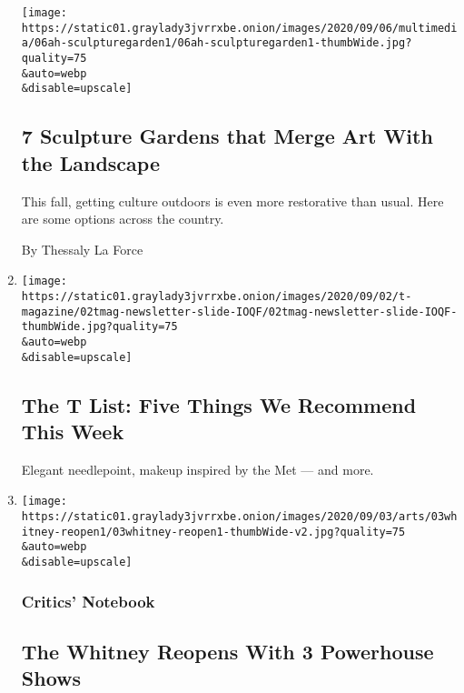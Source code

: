 \begin{enumerate}
  \texttt{[image: https://static01.graylady3jvrrxbe.onion/images/2020/09/06/multimedia/06ah-sculpturegarden1/06ah-sculpturegarden1-thumbWide.jpg?quality=75\\\&auto=webp\\\&disable=upscale]}

  \hypertarget{7-sculpture-gardens-that-merge-art-with-the-landscape}{%
  \subsection{7 Sculpture Gardens that Merge Art With the
  Landscape}\label{7-sculpture-gardens-that-merge-art-with-the-landscape}}

  This fall, getting culture outdoors is even more restorative than
  usual. Here are some options across the country.

  By Thessaly La Force
\item
  \href{/2020/09/03/t-magazine/ollies-pizza-estee-lauder-met.html}{}

  \texttt{[image: https://static01.graylady3jvrrxbe.onion/images/2020/09/02/t-magazine/02tmag-newsletter-slide-IOQF/02tmag-newsletter-slide-IOQF-thumbWide.jpg?quality=75\\\&auto=webp\\\&disable=upscale]}

  \hypertarget{the-t-list-five-things-we-recommend-this-week}{%
  \subsection{The T List: Five Things We Recommend This
  Week}\label{the-t-list-five-things-we-recommend-this-week}}

  Elegant needlepoint, makeup inspired by the Met --- and more.
\item
  \href{/2020/09/03/arts/design/whitney-museum-reopening.html}{}

  \texttt{[image: https://static01.graylady3jvrrxbe.onion/images/2020/09/03/arts/03whitney-reopen1/03whitney-reopen1-thumbWide-v2.jpg?quality=75\\\&auto=webp\\\&disable=upscale]}

  \hypertarget{critics-notebook}{%
  \subsubsection{Critics' Notebook}\label{critics-notebook}}

  \hypertarget{the-whitney-reopens-with-3-powerhouse-shows}{%
  \subsection{The Whitney Reopens With 3 Powerhouse
  Shows}\label{the-whitney-reopens-with-3-powerhouse-shows}}


\end{enumerate}
